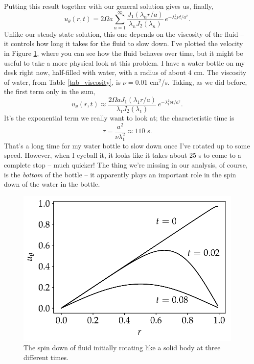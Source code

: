 Putting this result together with our general solution gives us, finally,
\begin{equation}
u_\theta(r, t) = 2\Omega a \sum_{n=1}^\infty \frac{J_1(\lambda_n r/a)}{\lambda_n J_2(\lambda_n)} \, e^{-\lambda_n^2 \nu t / a^2}.
\end{equation}
Unlike our steady state solution, this one depends on the viscosity of the fluid -- it controls how long it takes for the fluid to slow down.  I've plotted the velocity in Figure \ref{fig_spin_vel}, where you can see how the fluid behaves over time, but it might be useful to take a more physical look at this problem.  I have a water bottle on my desk right now, half-filled with water, with a radius of about $4$ cm.  The viscosity of water, from Table \ref{tab_viscosity}, is $\nu = 0.01$ cm$^2$/s.  Taking, as we did before, the first term only in the sum, 
\[
u_\theta(r, t) \approx \frac{2\Omega a J_1(\lambda_1 r/a)}{\lambda_1 J_2(\lambda_1)} \, e^{-\lambda_1^2 \nu t / a^2}.
\]
It's the exponential term we really want to look at; the characteristic time is
\[
\tau = \frac{a^2}{\nu \lambda_1^2} \approx 110 \text{ s}.
\]
That's a long time for my water bottle to slow down once I've rotated up to some speed.  However, when I eyeball it, it looks like it takes about 25 s to come to a complete stop -- much quicker!  The thing we're missing in our analysis, of course, is the \emph{bottom} of the bottle -- it apparently plays an important role in the spin down of the water in the bottle.

\begin{figure}
\centering
\includegraphics[width=0.7\linewidth]{Figures/Chapter2/fig_spin_vel}
\caption{The spin down of fluid initially rotating like a solid body at three different times.}
\label{fig_spin_vel}
\end{figure}



